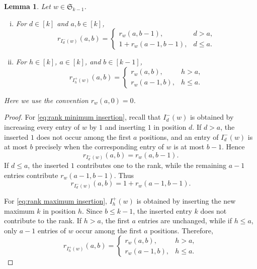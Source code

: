 \documentclass[12pt]{amsart}
\newtheorem{lem}[thm]{Lemma}
\theoremstyle{definition}
\numberwithin{equation}{section}
\begin{document}
\begin{lem}\label{l:rank insertion}
Let $w\in\mathfrak S_{k-1}$.

\begin{enumerate}[(i)]
    \item For $d\in[k]$ and $a,b\in[k]$,
    \begin{equation}
    r_{I_d^-(w)}(a,b)
    =
    \begin{cases}
    r_w(a,b-1), & d>a,\\[4pt]
    1+r_w(a-1,b-1), & d\leq a.
    \end{cases}
    \label{eq:rank minimum insertion}
    \end{equation}

    \item For $h\in[k]$, $a\in[k]$, and $b\in[k-1]$,
    \begin{equation}
    r_{I_h^+(w)}(a,b)
    =
    \begin{cases}
    r_w(a,b), & h>a,\\[4pt]
    r_w(a-1,b), & h\leq a.
    \end{cases}
    \label{eq:rank maximum insertion}
    \end{equation}
\end{enumerate}
Here we use the convention $r_w(a,0)=0$.
\end{lem}

\begin{proof}
For \eqref{eq:rank minimum insertion}, recall that $I_d^-(w)$ is
obtained by increasing every entry of $w$ by $1$ and inserting $1$ in
position $d$. If $d>a$, the inserted $1$ does not occur among the first
$a$ positions, and an entry of $I_d^-(w)$ is at most $b$ precisely when
the corresponding entry of $w$ is at most $b-1$. Hence
\begin{equation*}
r_{I_d^-(w)}(a,b)=r_w(a,b-1).
\end{equation*}
If $d\leq a$, the inserted $1$ contributes one to the rank, while the
remaining $a-1$ entries contribute $r_w(a-1,b-1)$. Thus
\begin{equation*}
r_{I_d^-(w)}(a,b)
=
1+r_w(a-1,b-1).
\end{equation*}

For \eqref{eq:rank maximum insertion}, $I_h^+(w)$ is obtained by
inserting the new maximum $k$ in position $h$. Since $b\leq k-1$, the
inserted entry $k$ does not contribute to the rank. If $h>a$, the first
$a$ entries are unchanged, while if $h\leq a$, only $a-1$ entries of
$w$ occur among the first $a$ positions. Therefore,
\begin{equation*}
r_{I_h^+(w)}(a,b)
=
\begin{cases}
r_w(a,b), & h>a,\\[4pt]
r_w(a-1,b), & h\leq a.
\end{cases}
\end{equation*}
\end{proof}
\end{document}

